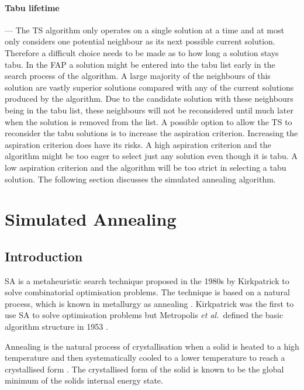\paragraph{Tabu lifetime}
--- The \gls{TS} algorithm only operates on a single solution at a time and at most only considers one potential neighbour as its next possible current solution. Therefore a difficult choice needs to be made as to how long a solution stays tabu. In the \gls{FAP} a solution might be entered into the tabu list early in the search process of the algorithm. A large majority of the neighbours of this solution are vastly superior solutions compared with any of the current solutions produced by the algorithm. Due to the candidate solution with these neighbours being in the tabu list, these neighbours will not be reconsidered until much later when the solution is removed from the list. A possible option to allow the \gls{TS} to reconsider the tabu solutions is to increase the aspiration criterion. Increasing the aspiration criterion does have its risks. A high aspiration criterion and the algorithm might be too eager to select just any solution even though it is tabu. A low aspiration criterion and the algorithm will be too strict in selecting a tabu solution. The following section discusses the simulated annealing algorithm.
\section{Simulated Annealing}
\label{sec:simulatedannealing}

\subsection{Introduction}
\label{sec:SAIntroduction}
\Gls{SA} is a metaheuristic search technique proposed in the 1980s by Kirkpatrick to solve combinatorial optimisation problems. The technique is based on a natural process, which is known in metallurgy as annealing \cite{SASingleMultiObj,TempCyclingSA}. Kirkpatrick was the first to use \gls{SA} to solve optimisation problems but Metropolis \emph{et al.}\ defined the basic algorithm structure in 1953 \cite{CurveFittingSA,VeryFastSAImageEnchancement}.

Annealing is the natural process of crystallisation when a solid is heated to a high temperature and then systematically cooled to a lower temperature to reach a crystallised form \cite{NewSAs,ConstantTempSA}. The crystallised form of the solid is known to be the global minimum of the solids internal energy state. 


